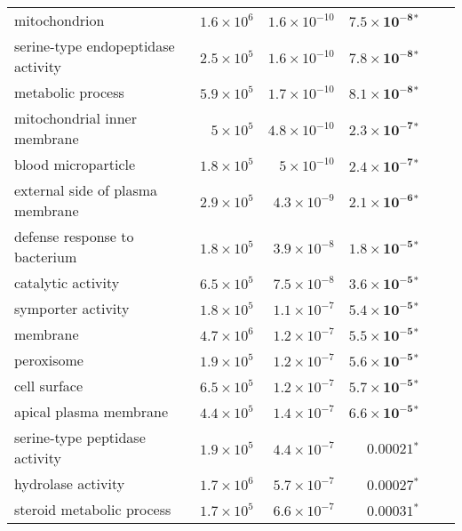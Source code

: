 \begin{longtable*}{|l|r|r|r|r|r|}
    mitochondrion                            & $1.6\times 10^{6}$ & $1.6\times 10^{-10}$ & $\bm{7.5\times 10^{-8}{^*}}$    \\
    serine-type endopeptidase activity       & $2.5\times 10^{5}$ & $1.6\times 10^{-10}$ & $\bm{7.8\times 10^{-8}{^*}}$    \\
    metabolic process                        & $5.9\times 10^{5}$ & $1.7\times 10^{-10}$ & $\bm{8.1\times 10^{-8}{^*}}$    \\
    mitochondrial inner membrane             & $ 5\times 10^{5}$  & $4.8\times 10^{-10}$ & $\bm{2.3\times 10^{-7}{^*}}$    \\
    blood microparticle                      & $1.8\times 10^{5}$ & $ 5\times 10^{-10}$  & $\bm{2.4\times 10^{-7}{^*}}$    \\
    external side of plasma membrane         & $2.9\times 10^{5}$ & $4.3\times 10^{-9}$  & $\bm{2.1\times 10^{-6}{^*}}$    \\
    defense response to bacterium            & $1.8\times 10^{5}$ & $3.9\times 10^{-8}$  & $\bm{1.8\times 10^{-5}{^*}}$    \\
    catalytic activity                       & $6.5\times 10^{5}$ & $7.5\times 10^{-8}$  & $\bm{3.6\times 10^{-5}{^*}}$    \\
    symporter activity                       & $1.8\times 10^{5}$ & $1.1\times 10^{-7}$  & $\bm{5.4\times 10^{-5}{^*}}$    \\
    membrane                                 & $4.7\times 10^{6}$ & $1.2\times 10^{-7}$  & $\bm{5.5\times 10^{-5}{^*}}$    \\
    peroxisome                               & $1.9\times 10^{5}$ & $1.2\times 10^{-7}$  & $\bm{5.6\times 10^{-5}{^*}}$    \\
    cell surface                             & $6.5\times 10^{5}$ & $1.2\times 10^{-7}$  & $\bm{5.7\times 10^{-5}{^*}}$    \\
    apical plasma membrane                   & $4.4\times 10^{5}$ & $1.4\times 10^{-7}$  & $\bm{6.6\times 10^{-5}{^*}}$    \\
    serine-type peptidase activity           & $1.9\times 10^{5}$ & $4.4\times 10^{-7}$  & $\bm{0.00021{^*}}$              \\
    hydrolase activity                       & $1.7\times 10^{6}$ & $5.7\times 10^{-7}$  & $\bm{0.00027{^*}}$              \\
    steroid metabolic process                & $1.7\times 10^{5}$ & $6.6\times 10^{-7}$  & $\bm{0.00031{^*}}$              \\

\end{longtable*}
